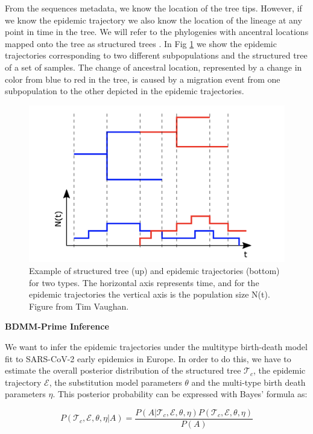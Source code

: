 From the sequences metadata, we know the location of the tree tips. However, if we know the epidemic trajectory we also know the location of the lineage at any point in time in the tree. We will refer to the phylogenies with ancentral locations mapped onto the tree as structured trees \cite{Vaughan2014}. In Fig \ref{fig:epitrajs} we show the epidemic trajectories corresponding to two different subpopulations and the structured tree of a set of samples. The change of ancestral location, represented by a change in color from blue to red in the tree, is caused by a migration event from one subpopulation to the other depicted in the epidemic trajectories.

\begin{figure}[h]
    \centering
    \includegraphics[width=\textwidth]{figures/epitrajs.png}
    \caption{Example of structured tree (up) and epidemic trajectories (bottom) for two types. The horizontal axis represents time, and for the epidemic trajectories the vertical axis is the population size N(t). Figure from Tim Vaughan.}
    \label{fig:epitrajs}
\end{figure}

\textbf{BDMM-Prime Inference}

We want to infer the epidemic trajectories under the multitype birth-death model fit to SARS-CoV-2 early epidemics in Europe. In order to do this, we have to estimate the overall posterior distribution of the structured tree $\mathcal{T}_c$, the epidemic trajectory $\mathcal{E}$, the substitution model parameters $\theta$ and the multi-type birth death parameters $\eta$. This posterior probability can be expressed with Bayes' formula as:

\begin{equation}
P(\mathcal{T}_c, \mathcal{E}, \theta, \eta | A ) = \frac{P(A | \mathcal{T}_c, \mathcal{E}, \theta, \eta ) P(\mathcal{T}_c, \mathcal{E}, \theta, \eta)}{P(A)}
\label{eq:posterior1}
\end{equation}

